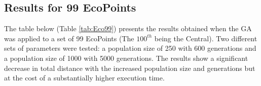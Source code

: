 \subsection{Results for 99 EcoPoints}

The table below (Table \ref{tab:Eco99}) presents the results obtained when the GA was applied to a set of 99 EcoPoints (The $100^{th}$ being the Central).
Two different sets of parameters were tested: a population size of 250 with 600 generations and a population size of 1000 with 5000 generations.
The results show a significant decrease in total distance with the increased population size and generations but at the cost of a substantially higher execution time.






